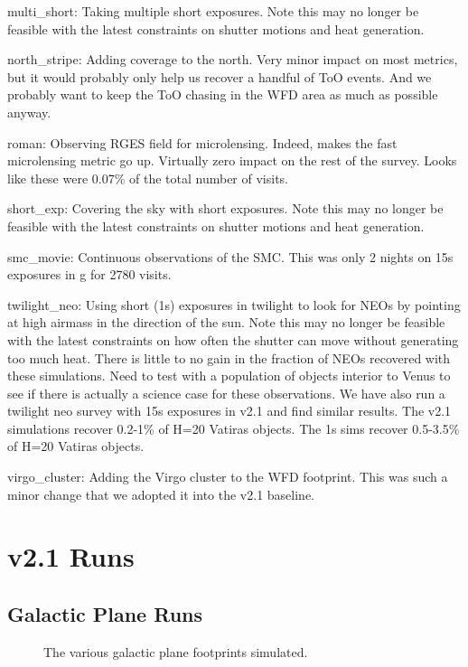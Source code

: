 multi\_short:  Taking multiple short exposures. Note this may no longer be feasible with the latest constraints on shutter motions and heat generation.

north\_stripe:  Adding coverage to the north. Very minor impact on most metrics, but it would probably only help us recover a handful of ToO events. And we probably want to keep the ToO chasing in the WFD area as much as possible anyway.

roman: Observing RGES field for microlensing. Indeed, makes the fast microlensing metric go up. Virtually zero impact on the rest of the survey. Looks like these were 0.07\% of the total number of visits. 

short\_exp: Covering the sky with short exposures. Note this may no longer be feasible with the latest constraints on shutter motions and heat generation.

smc\_movie: Continuous observations of the SMC. This was only 2 nights on 15s exposures in g for 2780 visits. 

twilight\_neo:  Using short (1s) exposures in twilight to look for NEOs by pointing at high airmass in the direction of the sun. Note this may no longer be feasible with the latest constraints on how often the shutter can move without generating too much heat. There is little to no gain in the fraction of NEOs recovered with these simulations. Need to test with a population of objects interior to Venus to see if there is actually a science case for these observations.  We have also run a twilight neo survey with 15s exposures in v2.1 and find similar results. The v2.1 simulations recover 0.2-1\% of H=20 Vatiras objects. The 1s sims recover 0.5-3.5\% of H=20 Vatiras objects.

virgo\_cluster:  Adding the Virgo cluster to the WFD footprint. This was such a minor change that we adopted it into the v2.1 baseline.


\section{v2.1 Runs}

\subsection{Galactic Plane Runs}

\begin{figure}
\caption{The various galactic plane footprints simulated.}
\end{figure}


